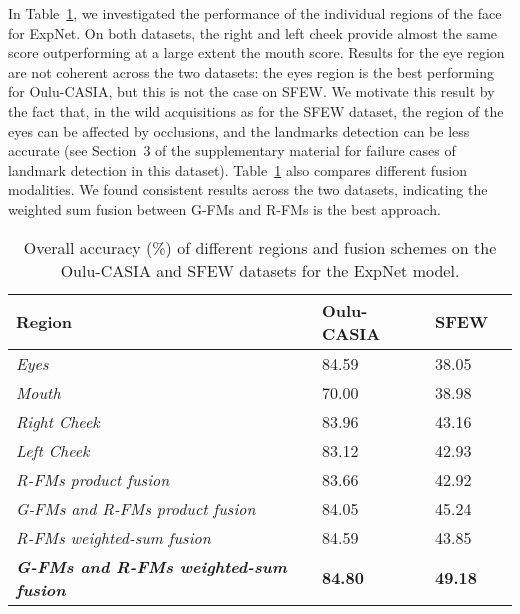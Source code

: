 \documentclass{bmvc2k}
\begin{document}
In Table~\ref{tab:ResultsRegions}, we investigated the performance of the individual regions of the face for ExpNet.
On both datasets, the right and left cheek provide almost the same score outperforming at a large extent the mouth score. Results for the eye region are not coherent across the two datasets: the eyes region is the best performing for Oulu-CASIA, but this is not the case on SFEW. We motivate this result by the fact that, in the wild acquisitions as for the SFEW dataset, the region of the eyes can be affected by occlusions, and the landmarks detection can be less accurate (see Section~3 of the supplementary material for failure cases of landmark detection in this dataset). 
Table~\ref{tab:ResultsRegions} also compares different fusion modalities. We found consistent results across the two datasets, indicating the weighted sum fusion between G-FMs and R-FMs is the best approach.

\setlength{\tabcolsep}{4pt}
\begin{table}[!ht]
\begin{center}
\small
\begin{tabular}{llll}
\hline
\textbf{Region}  & \textbf{Oulu-CASIA} & \textbf{SFEW}  \\

\hline

\it Eyes & 84.59 & 38.05
\\
\it Mouth & 70.00 & 38.98 \\

\it Right Cheek&  83.96 & 43.16 \\
\it Left Cheek &  83.12 & 42.93 \\

\hline

\it R-FMs product fusion &  83.66 & 42.92 \\
\it G-FMs and R-FMs product fusion & 84.05& 45.24 \\

\hline

\it R-FMs weighted-sum fusion & 84.59 & 43.85 \\
\it \textbf{G-FMs and R-FMs weighted-sum fusion} & \textbf{84.80} & \textbf{49.18} \\

\hline

\end{tabular}
\end{center}
\caption{Overall accuracy (\%) of different regions and fusion schemes on the Oulu-CASIA and SFEW datasets for the ExpNet model.}
\label{tab:ResultsRegions}
\end{table}
\setlength{\tabcolsep}{1.4pt}
\end{document}
